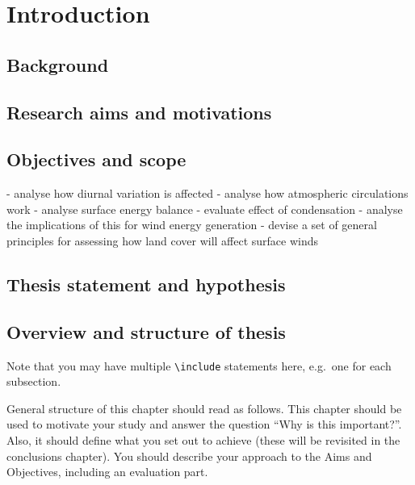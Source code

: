 \chapter{Introduction}
\label{ch:intro}

\section{Background}

\section{Research aims and motivations}


\section{Objectives and scope}

- analyse how diurnal variation is affected
- analyse how atmospheric circulations work
- analyse surface energy balance
- evaluate effect of condensation
- analyse the implications of this for wind energy generation
- devise a set of general principles for assessing how land cover will affect surface winds

\section{Thesis statement and hypothesis}

\section{Overview and structure of thesis}

Note that you may have multiple \texttt{{\textbackslash}include} statements here, e.g.\ one for each subsection.

General structure of this chapter should read as follows.  This chapter should be used to motivate your study and answer the question ``Why is this important?''. Also, it should define what you set out to achieve (these will be revisited in the conclusions chapter). You should describe your approach to the Aims and Objectives, including an evaluation part.